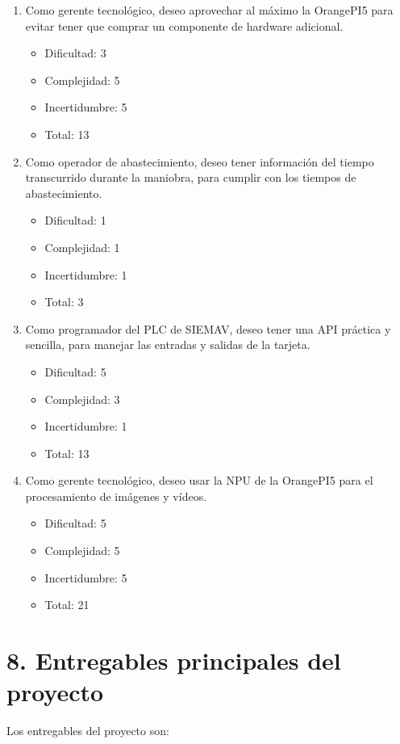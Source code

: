 \documentclass[
11pt, %
]{charter}
\begin{document}
\begin{enumerate}
	\item Como gerente tecnológico, deseo aprovechar al máximo la OrangePI5 para evitar tener que comprar un componente de hardware adicional.
		\begin{itemize}
			\item Dificultad: 3
			\item Complejidad: 5
			\item Incertidumbre: 5
			\item Total: 13
		\end{itemize}
	\item Como operador de abastecimiento, deseo tener información del tiempo transcurrido durante la maniobra, para cumplir con los tiempos de abastecimiento.
		\begin{itemize}
			\item Dificultad: 1
			\item Complejidad: 1
			\item Incertidumbre: 1
			\item Total: 3
		\end{itemize}	
	\item Como programador del PLC de SIEMAV, deseo tener una API práctica y sencilla, para manejar las entradas y salidas de la tarjeta.
		\begin{itemize}
			\item Dificultad: 5
			\item Complejidad: 3
			\item Incertidumbre: 1
			\item Total: 13 
		\end{itemize}	
	\item Como gerente tecnológico, deseo usar la NPU de la OrangePI5 para el procesamiento de imágenes y vídeos.
		\begin{itemize}
			\item Dificultad: 5
			\item Complejidad: 5
			\item Incertidumbre: 5
			\item Total: 21
		\end{itemize}
\end{enumerate}
\section{8. Entregables principales del proyecto}
\label{sec:entregables}


Los entregables del proyecto son:
\end{document}
